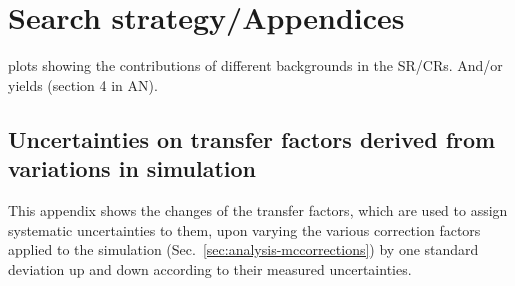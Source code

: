 \chapter{Search strategy/Appendices}
\label{app:analysis}



%

plots showing the contributions of different backgrounds in 
the SR/CRs. And/or yields (section 4 in AN).

\section{Uncertainties on transfer factors derived from variations in 
simulation}
\label{app:tfvariations}
This appendix shows the changes of the transfer factors, which are used to 
assign systematic uncertainties to them, upon varying the various correction 
factors applied to the simulation (Sec.~\ref{sec:analysis-mccorrections}) by 
one standard deviation up and down according to their measured uncertainties.

